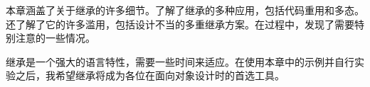 本章涵盖了关于继承的许多细节。了解了继承的多种应用，包括代码重用和多态。还了解了它的许多滥用，包括设计不当的多重继承方案。在过程中，发现了需要特别注意的一些情况。

继承是一个强大的语言特性，需要一些时间来适应。在使用本章中的示例并自行实验之后，我希望继承将成为各位在面向对象设计时的首选工具。
